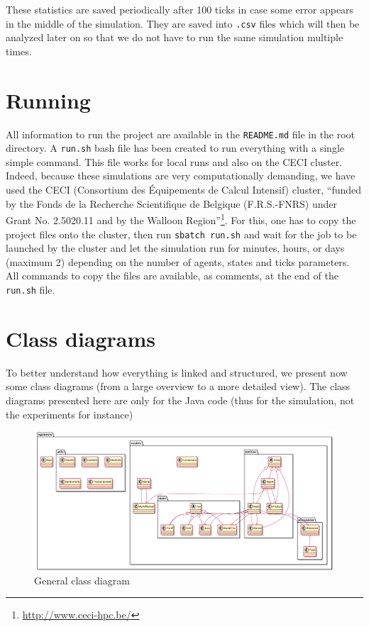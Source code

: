 These statistics are saved periodically after 100 ticks in case some error appears in the middle of the simulation. They are saved into \texttt{.csv} files which will then be analyzed later on so that we do not have to run the same simulation multiple times. 


\section{Running}
All information to run the project are available in the \texttt{README.md} file in the root directory. A \texttt{run.sh} bash file has been created to run everything with a single simple command. This file works for local runs and also on the CECI cluster. Indeed, because these simulations are very computationally demanding, we have used the CECI (Consortium des Équipements de Calcul Intensif) cluster, ``funded by the Fonds de la Recherche Scientifique de Belgique (F.R.S.-FNRS) under Grant No. 2.5020.11 and by the Walloon Region''\footnote{\url{http://www.ceci-hpc.be/}}. For this, one has to copy the project files onto the cluster, then run \texttt{sbatch run.sh} and wait for the job to be launched by the cluster and let the simulation run for minutes, hours, or days (maximum 2) depending on the number of agents, states and ticks parameters. All commands to copy the files are available, as comments, at the end of the \texttt{run.sh} file.


\section{Class diagrams}

    To better understand how everything is linked and structured, we present now some class diagrams (from a large overview to a more detailed view). The class diagrams presented here are only for the Java code (thus for the simulation, not the experiments for instance)


    \begin{figure}[H]
        \centering
        \includegraphics[width=1\textwidth]{img/generalCD.png}
        \caption{General class diagram}
        \label{fig:class_diagram_general}
    \end{figure}


